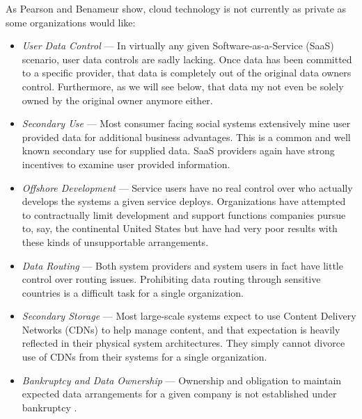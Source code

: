 As Pearson and Benameur \cite{proposal:privacy-security-trust-cloud} show, cloud technology is not currently as private as some organizations would like:
\begin{itemize}
\item \textit{User Data Control} --- In virtually any given Software-as-a-Service (SaaS) scenario, user data controls are sadly lacking.  Once data has been committed to a specific provider, that data is completely out of the original data owners control.  Furthermore, as we will see below, that data my not even be solely owned by the original owner anymore either.
\item \textit{Secondary Use} --- Most consumer facing social systems extensively mine user provided data for additional business advantages.  This is a common and well known secondary use for supplied data.  SaaS providers again have strong incentives to examine user provided information.
\item \textit{Offshore Development} --- Service users have no real control over who actually develops the systems a given service deploys.  Organizations have attempted to contractually limit development and support functions companies pursue to, say, the continental United States but have had very poor results with these kinds of unsupportable arrangements.
\item \textit{Data Routing} --- Both system providers and system users in fact have little control over routing issues.  Prohibiting data routing through sensitive countries is a difficult task for a single organization.
\item \textit{Secondary Storage} --- Most large-scale systems expect to use Content Delivery Networks (CDNs) to help manage content, and that expectation is heavily reflected in their physical system architectures. They simply cannot divorce use of CDNs from their systems for a single organization.
\item \textit{Bankruptcy and Data Ownership} --- Ownership and obligation to maintain expected data arrangements for a given company is not established under bankruptcy \cite{proposal:borders-info-I,proposal:borders-info-II,proposal:borders-info-III}.
\end{itemize}

